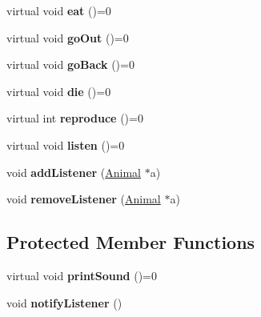 \begin{DoxyCompactItemize}
virtual void {\bfseries eat} ()=0
\item 
\mbox{\label{class_animal_afcacae4af51b4f3fc88a1354f21dc7a7}} 
virtual void {\bfseries go\+Out} ()=0
\item 
\mbox{\label{class_animal_af74e43a1338419fe4582e61e2b4d8d34}} 
virtual void {\bfseries go\+Back} ()=0
\item 
\mbox{\label{class_animal_a6cc3df8555c60352f9c55ca174a9f9df}} 
virtual void {\bfseries die} ()=0
\item 
\mbox{\label{class_animal_aaa82a4b9ceb712c473d84b87c920043f}} 
virtual int {\bfseries reproduce} ()=0
\item 
\mbox{\label{class_animal_a126acfdd961c2d49373159b256d71b23}} 
virtual void {\bfseries listen} ()=0
\item 
\mbox{\label{class_animal_ae3e210967f50cee3ef1023d985976867}} 
void {\bfseries add\+Listener} (\hyperlink{class_animal}{Animal} $\ast$a)
\item 
\mbox{\label{class_animal_a83e0c4009f62540aca99f0b5ceeb7fdd}} 
void {\bfseries remove\+Listener} (\hyperlink{class_animal}{Animal} $\ast$a)
\end{DoxyCompactItemize}
\subsection*{Protected Member Functions}
\begin{DoxyCompactItemize}
\item 
\mbox{\label{class_animal_a93ad63b6239f8f18d167034b7948f35a}} 
virtual void {\bfseries print\+Sound} ()=0
\item 
\mbox{\label{class_animal_aa1ebce4b14be5e3d38c831b51a7ac307}} 
void {\bfseries notify\+Listener} ()
\end{DoxyCompactItemize}

